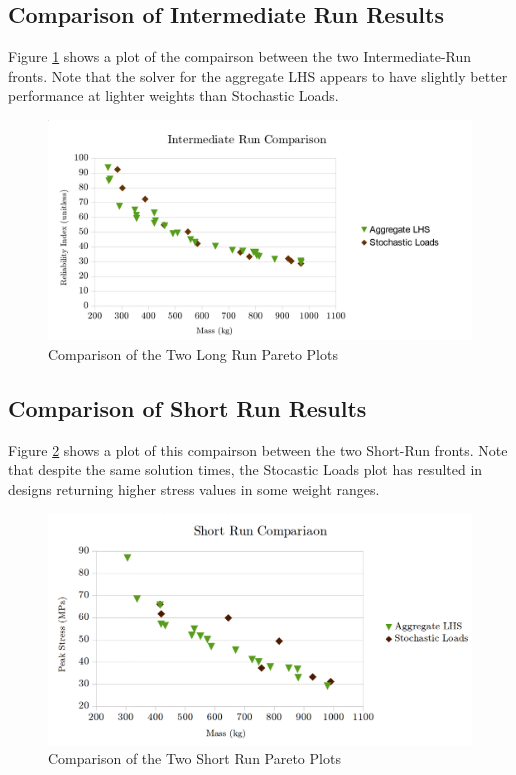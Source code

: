 \subsection{Comparison of Intermediate Run Results}
Figure \ref{fig:pfront_comp_int} shows a plot of the compairson between the two Intermediate-Run fronts. Note that the solver for the aggregate LHS appears to have slightly better performance at lighter weights than Stochastic Loads. 

\begin{figure}[!htbp]
\includegraphics[width=\textwidth]{img/pf_comp_int.png}
\caption{Comparison of the Two Long Run Pareto Plots}
\label{fig:pfront_comp_int}
\end{figure}

\subsection{Comparison of Short Run Results}
Figure \ref{fig:pfront_comp_short} shows a plot of this compairson between the two Short-Run fronts. Note that despite the same solution times, the Stocastic Loads plot has resulted in designs returning higher stress values in some weight ranges. 

\begin{figure}[!htbp]
\includegraphics[width=\textwidth]{img/pf_comp_short.png}
\caption{Comparison of the Two Short Run Pareto Plots}
\label{fig:pfront_comp_short}
\end{figure}

